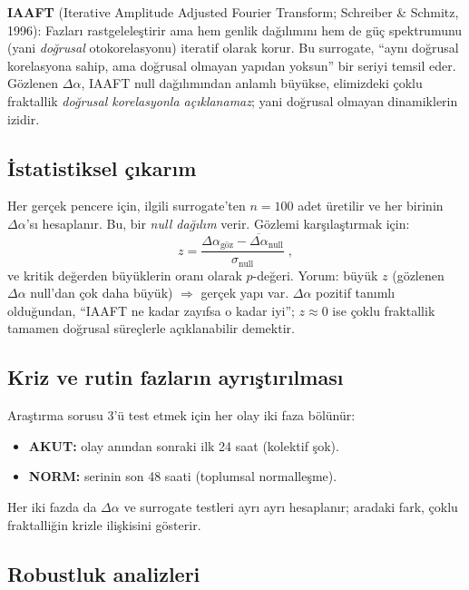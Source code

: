 \documentclass[11pt,a4paper]{article}
\newcommand{\Dal}{\Delta\alpha}
\begin{document}
\textbf{IAAFT} (Iterative Amplitude Adjusted Fourier Transform; Schreiber \&
Schmitz, 1996): Fazları rastgeleleştirir ama hem genlik dağılımını hem de güç
spektrumunu (yani \emph{doğrusal} otokorelasyonu) iteratif olarak korur. Bu
surrogate, ``aynı doğrusal korelasyona sahip, ama doğrusal olmayan yapıdan
yoksun'' bir seriyi temsil eder. Gözlenen $\Dal$, IAAFT null dağılımından
anlamlı büyükse, elimizdeki çoklu fraktallik \emph{doğrusal korelasyonla
açıklanamaz}; yani doğrusal olmayan dinamiklerin izidir.

\subsection{İstatistiksel çıkarım}

Her gerçek pencere için, ilgili surrogate'ten $n=100$ adet üretilir ve her
birinin $\Dal$'sı hesaplanır. Bu, bir \emph{null dağılım} verir. Gözlemi
karşılaştırmak için:
\begin{equation}
  z = \frac{\Dal_{\text{göz}} - \overline{\Dal}_{\text{null}}}
           {\sigma_{\text{null}}}\;,
\end{equation}
ve kritik değerden büyüklerin oranı olarak $p$-değeri. Yorum: büyük $z$
(gözlenen $\Dal$ null'dan çok daha büyük) $\Rightarrow$ gerçek yapı var.
$\Dal$ pozitif tanımlı olduğundan, ``IAAFT ne kadar zayıfsa o kadar iyi'';
$z \approx 0$ ise çoklu fraktallik tamamen doğrusal süreçlerle açıklanabilir
demektir.

\subsection{Kriz ve rutin fazların ayrıştırılması}

Araştırma sorusu 3'ü test etmek için her olay iki faza bölünür:
\begin{itemize}[leftmargin=1.4em]
  \item \textbf{AKUT:} olay anından sonraki ilk 24 saat (kolektif şok).
  \item \textbf{NORM:} serinin son 48 saati (toplumsal normalleşme).
\end{itemize}
Her iki fazda da $\Dal$ ve surrogate testleri ayrı ayrı hesaplanır; aradaki
fark, çoklu fraktalliğin krizle ilişkisini gösterir.

\subsection{Robustluk analizleri}
\end{document}
